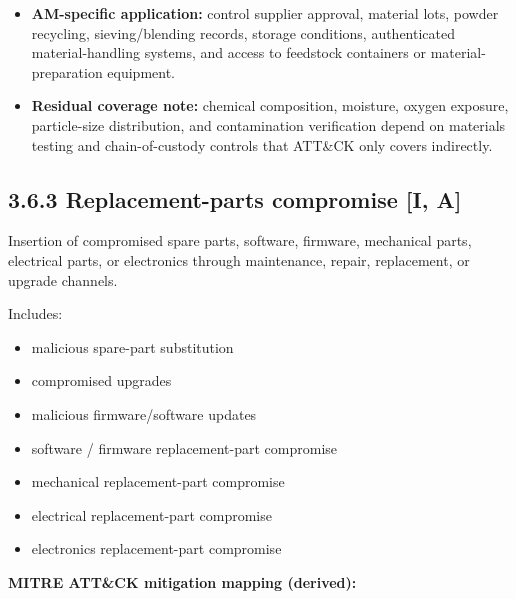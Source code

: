 \documentclass[10pt,a4paper,oneside]{report}
\begin{document}
\begin{itemize}
\item \textbf{AM-specific application:} control supplier approval, material lots, powder recycling, sieving/blending records, storage conditions, authenticated material-handling systems, and access to feedstock containers or material-preparation equipment.
\end{itemize}

\begin{itemize}
\item \textbf{Residual coverage note:} chemical composition, moisture, oxygen exposure, particle-size distribution, and contamination verification depend on materials testing and chain-of-custody controls that ATT\&CK only covers indirectly.
\end{itemize}


\subsection{3.6.3 Replacement-parts compromise [I, A]}


Insertion of compromised spare parts, software, firmware, mechanical parts, electrical parts, or electronics through maintenance, repair, replacement, or upgrade channels.

Includes:

\begin{itemize}
\item malicious spare-part substitution
\item compromised upgrades
\item malicious firmware/software updates
\item software / firmware replacement-part compromise
\item mechanical replacement-part compromise
\item electrical replacement-part compromise
\item electronics replacement-part compromise
\end{itemize}

\textbf{MITRE ATT\&CK mitigation mapping (derived):}
\end{document}
